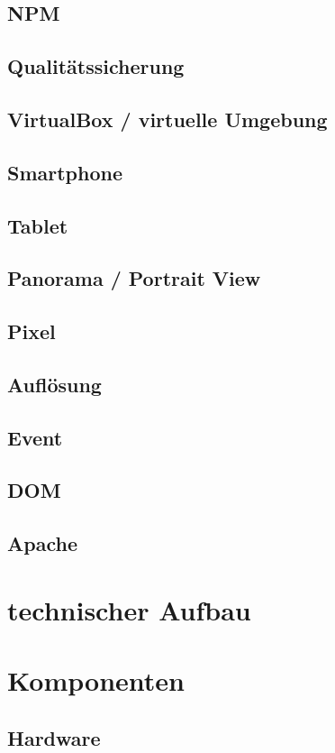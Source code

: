 		\subsection{NPM}
		\subsection{Qualitätssicherung}
		\subsection{VirtualBox / virtuelle Umgebung}
		\subsection{Smartphone}
		\subsection{Tablet}
		\subsection{Panorama / Portrait View}
		\subsection{Pixel}
		\subsection{Auflösung}
		\subsection{Event}
		\subsection{DOM}
		\subsection{Apache}
	
	\section{technischer Aufbau}
	
	\section{Komponenten}
		\subsection{}
		\subsection{Hardware}
